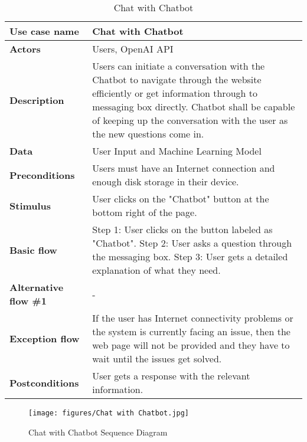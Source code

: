 \documentclass[listof=nochaptergap]{report}
\begin{document}
\begin{table}[H]
        \centering
         \begin{tabular}{| p{4cm} | p{10cm} |} 
         \hline
         \textbf{Use case name} & Chat with Chatbot \\
         \hline
         \textbf{Actors} & Users, OpenAI API \\
         \hline
         \textbf{Description} & Users can initiate a conversation with the Chatbot to navigate through the website efficiently or get information through to messaging box directly. Chatbot shall be capable of keeping up the conversation with the user as the new questions come in. \\
         \hline
         \textbf{Data} & User Input and Machine Learning Model  \\
         \hline
         \textbf{Preconditions} & Users must have an Internet connection and enough disk storage in their device. \\
         \hline
         \textbf{Stimulus} & User clicks on the "Chatbot" button at the bottom right of the page. \\
         \hline
         \textbf{Basic flow} & Step 1: User clicks on the button labeled as "Chatbot". \newline Step 2: User asks a question through the messaging box. \newline Step 3: User gets a detailed explanation of what they need. \\
         \hline
         \textbf{Alternative flow \#1} & - \\
         \hline
         \textbf{Exception flow} & If the user has Internet connectivity problems or the system is currently facing an issue, then the web page will not be provided and they have to wait until the issues get solved. \\
         \hline
         \textbf{Postconditions} & User gets a response with the relevant information. \\
         \hline
         \end{tabular}
        \caption{Chat with Chatbot}
        \label{tab:table17}
    \end{table}

        \begin{center}
            \begin{figure}[H]
                \centering
                \texttt{[image: figures/Chat with Chatbot.jpg]}
                \caption{Chat with Chatbot Sequence Diagram} 
                \label{fig:figure1}
            \end{figure}
        \end{center}
\end{document}
